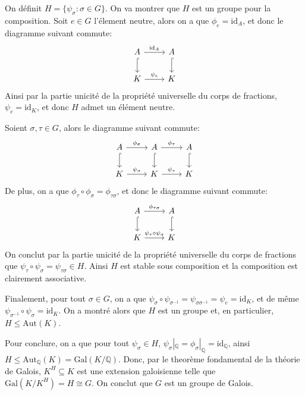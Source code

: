 \documentclass[french]{article}
\newcommand{\Q}{\mathbb{Q}}
\newcommand{\id}{\mathrm{id}}
\newcommand{\Gal}{\mathrm{Gal}}
\newcommand{\Aut}{\mathrm{Aut}}
\begin{document}
On définit $H = \{\psi_\sigma: \sigma \in G\}$. On va montrer
que $H$ est un groupe pour la composition. Soit $e \in G$
l'élement neutre, alors on a que $\phi_e = \id_A$, et donc le
diagramme suivant commute:
\begin{equation*}
\begin{tikzcd}
	A \arrow[r, "\id_A"] \arrow[d, hook] & A \arrow[d, hook] \\
K \arrow[r, "\psi_{e}"]         & K
\end{tikzcd}
\end{equation*}
Ainsi par la partie unicité de la propriété universelle du
corps de fractions, $\psi_e = \id_K$, et donc $H$ admet un
élément neutre.

Soient $\sigma, \tau \in G$, alors le diagramme suivant commute:
\begin{equation*}
\begin{tikzcd}
A \arrow[r, "\phi_\sigma"] \arrow[d, hook] & A \arrow[d, hook] \arrow[r,"\phi_{\tau}"] & A \arrow[d, hook] \\
K \arrow[r, "\psi_\sigma"]                 & K \arrow[r, "\psi_{\tau}"]                 & K
\end{tikzcd}
\end{equation*}
De plus, on a que
$\phi_{\tau}\circ\phi_{\sigma} = \phi_{\tau\sigma}$, et donc
le diagramme suivant commute:
\begin{equation*}
\begin{tikzcd}
	A \arrow[r, "\phi_{\tau\sigma}"] \arrow[d, hook] & A \arrow[d, hook] \\
K \arrow[r, "\psi_{\tau}\circ\psi_\sigma"]         & K
\end{tikzcd}
\end{equation*}
On conclut par la partie unicité de la
propriété universelle du corps de fractions que
$\psi_\tau\circ\psi_\sigma = \psi_{\tau\sigma} \in H$.
Ainsi $H$ est stable sous composition et la composition est
clairement associative.

Finalement, pour tout $\sigma \in G$, on a que
$\psi_\sigma \circ \psi_{\sigma^{-1}} = 
\psi_{\sigma\sigma^{-1}} = \psi_e = \id_K$,
et de même $\psi_{\sigma^{-1}} \circ \psi_\sigma = \id_K$.
On a montré alors que $H$ est un groupe et, en particulier,
$H \leq \Aut(K)$.

Pour conclure, on a que pour tout $\psi_\sigma \in H$,
$\psi_\sigma|_\Q = \phi_\sigma|_\Q = \id_\Q$, ainsi
$H \leq \Aut_\Q(K) = \Gal(K/\Q)$.
Donc, par le theorème fondamental de la théorie de Galois,
$K^H \subseteq K$ est une extension galoisienne telle que 
$\Gal(K/K^H) = H \cong G$. On conclut que $G$ est un groupe de
Galois.
\end{document}
